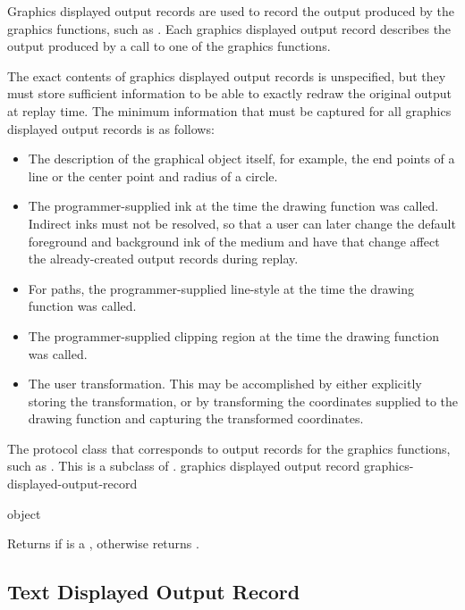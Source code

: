 Graphics displayed output records are used to record the output produced by the
graphics functions, such as .  Each graphics displayed output
record describes the output produced by a call to one of the graphics functions.

The exact contents of graphics displayed output records is unspecified, but they
must store sufficient information to be able to exactly redraw the original
output at replay time.  The minimum information that must be captured for
all graphics displayed output records is as follows:

\begin{itemize}
\item The description of the graphical object itself, for example, the end
points of a line or the center point and radius of a circle.

\item The programmer-supplied ink at the time the drawing function was called.
Indirect inks must not be resolved, so that a user can later change the default
foreground and background ink of the medium and have that change affect the
already-created output records during replay.

\item For paths, the programmer-supplied line-style at the time the drawing
function was called.

\item The programmer-supplied clipping region at the time the drawing function
was called.

\item The user transformation.  This may be accomplished by either explicitly
storing the transformation, or by transforming the coordinates supplied to the
drawing function and capturing the transformed coordinates.
\end{itemize}



The protocol class that corresponds to output records for the graphics
functions, such as .  This is a subclass of
.
 {graphics displayed output record} {graphics-displayed-output-record} 

 {object}

Returns  if  is a , otherwise returns .


\subsection {Text Displayed Output Record}

